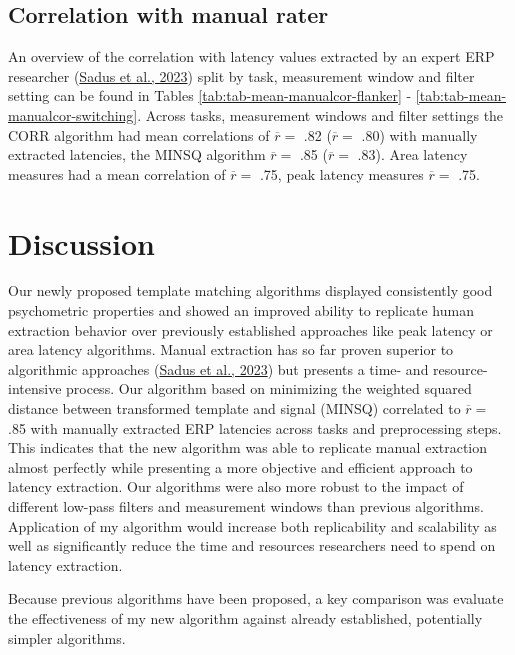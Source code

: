 \documentclass[
  man]{apa7}
\begin{document}
\hypertarget{correlation-with-manual-rater}{%
\subsection{Correlation with manual rater}\label{correlation-with-manual-rater}}

An overview of the correlation with latency values extracted by an expert ERP researcher (\protect\hyperlink{ref-sadus2023multiverse}{Sadus et al., 2023}) split by task, measurement window and filter setting can be found in Tables \ref{tab:tab-mean-manualcor-flanker} - \ref{tab:tab-mean-manualcor-switching}. Across tasks, measurement windows and filter settings the CORR algorithm had mean correlations of \(\overline{r} =\) .82 (\(\overline{r} =\) .80) with manually extracted latencies, the MINSQ algorithm \(\overline{r} =\) .85 (\(\overline{r} =\) .83). Area latency measures had a mean correlation of \(\overline{r} =\) .75, peak latency measures \(\overline{r} =\) .75.

\hypertarget{discussion}{%
\section{Discussion}\label{discussion}}

Our newly proposed template matching algorithms displayed consistently good psychometric properties and showed an improved ability to replicate human extraction behavior over previously established approaches like peak latency or area latency algorithms. Manual extraction has so far proven superior to algorithmic approaches (\protect\hyperlink{ref-sadus2023multiverse}{Sadus et al., 2023}) but presents a time- and resource-intensive process. Our algorithm based on minimizing the weighted squared distance between transformed template and signal (MINSQ) correlated to \(\overline{r} =\) .85 with manually extracted ERP latencies across tasks and preprocessing steps. This indicates that the new algorithm was able to replicate manual extraction almost perfectly while presenting a more objective and efficient approach to latency extraction. Our algorithms were also more robust to the impact of different low-pass filters and measurement windows than previous algorithms. Application of my algorithm would increase both replicability and scalability as well as significantly reduce the time and resources researchers need to spend on latency extraction.

Because previous algorithms have been proposed, a key comparison was evaluate the effectiveness of my new algorithm against already established, potentially simpler algorithms.
\end{document}
